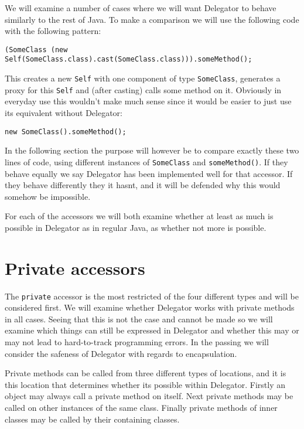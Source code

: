 \documentclass[a4paper,12pt]{book}
\begin{document}
We will examine a number of cases where we will want Delegator to behave similarly to the rest of Java. To make a comparison we will use the following code with the following pattern:

\begin{verbatim}
(SomeClass (new Self(SomeClass.class).cast(SomeClass.class))).someMethod();
\end{verbatim}

This creates a new \verb|Self| with one component of type \verb|SomeClass|, generates a proxy for this \verb|Self| and (after casting) calls some method on it. Obviously in everyday use this wouldn't make much sense since it would be easier to just use its equivalent without Delegator:

\begin{verbatim}
new SomeClass().someMethod();
\end{verbatim}

In the following section the purpose will however be to compare exactly these two lines of code, using different instances of \verb|SomeClass| and \verb|someMethod()|. If they behave equally we say Delegator has been implemented well for that accessor. If they behave differently they it hasnt, and it will be defended why this would somehow be impossible.

For each of the accessors we will both examine whether at least as much is possible in Delegator as in regular Java, as whether not more is possible.

\section*{Private accessors}
The \verb|private| accessor is the most restricted of the four different types and will be considered first. We will examine whether Delegator works with private methods in all cases. Seeing that this is not the case and cannot be made so we will examine which things can still be expressed in Delegator and whether this may or may not lead to hard-to-track programming errors. In the passing we will consider the safeness of Delegator with regards to encapsulation.

Private methods can be called from three different types of locations, and it is this location that determines whether its possible within Delegator. Firstly an object may always call a private method on itself. Next private methods may be called on other instances of the same class. Finally private methods of inner classes may be called by their containing classes.
\end{document}
